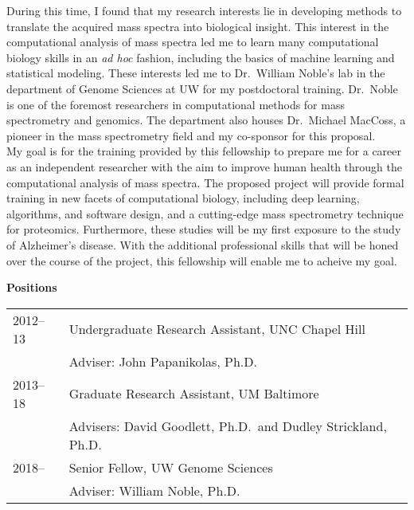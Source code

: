 \documentclass[11pt]{article}
\newcommand{\mysection}[1]{\vspace{1ex}{\bf #1} \vspace*{0.3ex}}
\begin{document}
\indent During this time, I found that my research interests lie in developing methods to translate the acquired mass spectra into biological insight. This interest in the computational analysis of mass spectra led me to learn many computational biology skills in an {\it ad hoc} fashion, including the basics of machine learning and statistical modeling. These interests  led me to Dr.\ William Noble's lab in the department of Genome Sciences at UW for my postdoctoral training. Dr.\ Noble is one of the foremost researchers in computational methods for mass spectrometry and genomics. The department also houses Dr.\ Michael MacCoss, a pioneer in the mass spectrometry field and my co-sponsor for this proposal.\\

\indent My goal is for the training provided by this fellowship to prepare me for a career as an independent researcher with the aim to improve human health through the computational analysis of mass spectra. The proposed project will provide formal training in new facets of computational biology, including deep learning, algorithms, and software design, and a cutting-edge mass spectrometry technique for proteomics. Furthermore, these studies will be my first exposure to the study of Alzheimer's disease. With the additional professional skills that will be honed over the course of the project, this fellowship will enable me to acheive my goal.

\mysection{B. Positions and Honors}


{\bf Positions} \\
\begin{tabular}{p{0.75in}p{6.5in}}
  2012--13 & Undergraduate Research Assistant, UNC Chapel Hill\\
           & Adviser: John Papanikolas, Ph.D. \\
  2013--18 & Graduate Research Assistant, UM Baltimore\\
           & Advisers: David Goodlett, Ph.D.\ and Dudley Strickland, Ph.D.\\
  2018--   & Senior Fellow, UW Genome Sciences\\
           & Adviser: William Noble, Ph.D.\\
\end{tabular}
\end{document}
